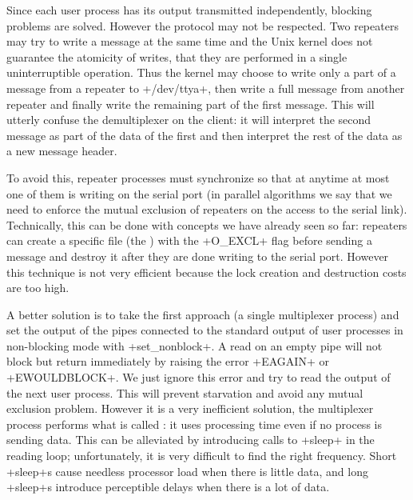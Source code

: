 Since each user process has its output transmitted independently,
blocking problems are solved. However the protocol may not be
respected. Two repeaters may try to write a message at the same time
and the Unix kernel does not guarantee the atomicity of writes, \ie{} 
that they are performed in a single uninterruptible operation.
Thus the kernel may choose to write only a part of a message from a
repeater to \ml+/dev/ttya+, then write a full message from another
repeater and finally write the remaining part of the first message.
This will utterly confuse the demultiplexer on the client: 
it will interpret the second message as part of the data of the
first and then interpret the rest of the data as a new message header.

To avoid this, repeater processes must synchronize so that at anytime
at most one of them is writing on the serial port (in parallel
algorithms we say that we need to enforce the mutual exclusion of
repeaters on the access to the serial link). Technically, this can be
done with concepts we have already seen so far: repeaters can create a
specific file (the ) with the \ml+O_EXCL+ flag before
sending a message and destroy it after they are done writing to the
serial port. However this technique is not very efficient because the
lock creation and destruction costs are too high.

A better solution is to take the first approach (a single
multiplexer process) and set the output of the pipes connected to the
standard output of user processes in non-blocking mode with
\ml+set_nonblock+. A read on an empty pipe will not block but return
immediately by raising the error \ml+EAGAIN+ or \ml+EWOULDBLOCK+. We
just ignore this error and try to read the output of the next user
process. This will prevent starvation and avoid any mutual exclusion
problem. However it is a very inefficient solution, the multiplexer
process performs what is called : it uses
processing time even if no process is
sending data. This can be alleviated by introducing calls to
\ml+sleep+ in the reading loop; unfortunately, it is very difficult to find
the right frequency. Short \ml+sleep+s cause needless processor load when there
is little data, and long \ml+sleep+s introduce perceptible delays when there is a lot of data.

